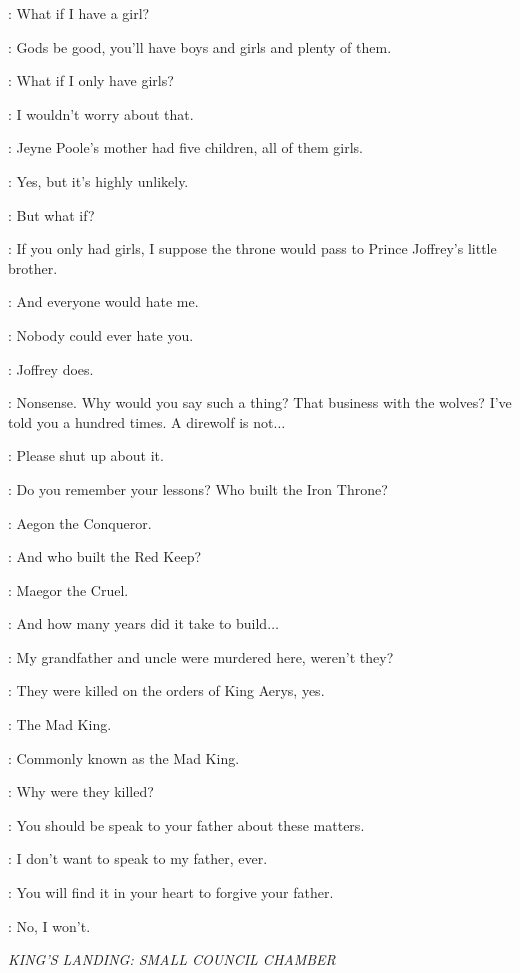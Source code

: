 \SANSA: What if I have a girl? 

\SEPTAMORDANE: Gods be good, you'll have boys and girls and plenty of them. 

\SANSA: What if I only have girls? 

\SEPTAMORDANE: I wouldn't worry about that. 

\SANSA: Jeyne Poole's mother had five children, all of them girls. 

\SEPTAMORDANE: Yes, but it's highly unlikely. 

\SANSA: But what if? 

\SEPTAMORDANE: If you only had girls, I suppose the throne would pass to Prince Joffrey's little brother. 

\SANSA: And everyone would hate me. 

\SEPTAMORDANE: Nobody could ever hate you. 

\SANSA: Joffrey does. 

\SEPTAMORDANE: Nonsense. Why would you say such a thing? That business with the wolves? I've told you a hundred times. A direwolf is not$\ldots$ 

\SANSA: Please shut up about it. 

\SEPTAMORDANE: Do you remember your lessons? Who built the Iron Throne? 

\SANSA: Aegon the Conqueror. 

\SEPTAMORDANE: And who built the Red Keep? 

\SANSA: Maegor the Cruel. 

\SEPTAMORDANE: And how many years did it take to build$\ldots$ 

\SANSA: My grandfather and uncle were murdered here, weren't they? 

\SEPTAMORDANE: They were killed on the orders of King Aerys, yes. 

\SANSA: The Mad King. 

\SEPTAMORDANE: Commonly known as the Mad King. 

\SANSA: Why were they killed? 

\SEPTAMORDANE: You should be speak to your father about these matters. 

\SANSA: I don't want to speak to my father, ever. 

\SEPTAMORDANE: You will find it in your heart to forgive your father. 

\SANSA: No, I won't. 

\scene

\textit{KING'S LANDING: SMALL COUNCIL CHAMBER}

